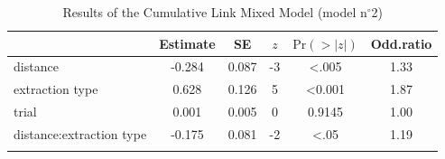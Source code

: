 \begin{table}
\begin{tabular}{l S[table-format=-1.3] S[table-format=1.3] S[table-format=-1] S[table-format=<1.3] S[table-format=1.2]}
  \lsptoprule
          & {Estimate} & {SE} & {$z$} & {$\text{Pr}(>|z|)$} & {Odd.ratio} \\ 
  \midrule
  distance & -0.284 & 0.087 & -3 & <.005 & 1.33 \\ 
  extraction type & 0.628 & 0.126 & 5 & <0.001 & 1.87 \\ 
  trial & 0.001 & 0.005 & 0 & 0.9145 & 1.00 \\ 
  distance:extraction type & -0.175 & 0.081 & -2 & <.05 & 1.19 \\ 
   \lspbottomrule
\end{tabular}
\caption{Results of the Cumulative Link Mixed Model (model n$^{\circ}$2)}
\label{tab:exp1-m2}
\end{table}
